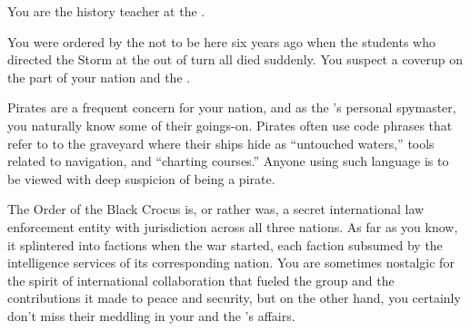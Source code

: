 \documentclass[char]{GL2020}
\begin{document}
\begin{itemz}[Notes]
    \item You are the history teacher at the \pSchool{}.
    \item You were ordered by the \cQueen{\Monarch} not to be here six years ago when the students who directed the Storm at the \pShippies{} out of turn all died suddenly. You suspect a coverup on the part of your nation and the \pTech{}.
    \item Pirates are a frequent concern for your nation, and as the \cQueen{\Monarch}'s personal spymaster, you naturally know some of their goings-on. Pirates often use code phrases that refer to to the graveyard where their ships hide as ``untouched waters,'' tools related to navigation, and ``charting courses.'' Anyone using such language is to be viewed with deep suspicion of being a pirate.
    \item The Order of the Black Crocus is, or rather was, a secret international law enforcement entity with jurisdiction across all three nations. As far as you know, it splintered into factions when the war started, each faction subsumed by the intelligence services of its corresponding nation. You are sometimes nostalgic for the spirit of international collaboration that fueled the group and the contributions it made to peace and security, but on the other hand, you certainly don't miss their meddling in your and the \cQueen{\Monarch}'s affairs.
\end{itemz}
\end{document}
